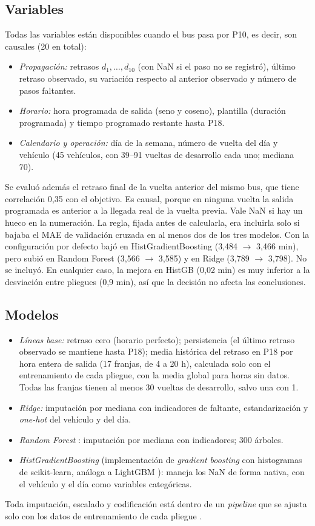\documentclass[conference,spanish]{IEEEtran}
\begin{document}
\subsection{Variables}
Todas las variables están disponibles cuando el bus pasa por P10, es decir, son causales (20 en total):
\begin{itemize}
    \item \emph{Propagación:} retrasos $d_1,\dots,d_{10}$ (con NaN si el paso no se registró), último retraso observado, su variación respecto al anterior observado y número de pasos faltantes.
    \item \emph{Horario:} hora programada de salida (seno y coseno), plantilla (duración programada) y tiempo programado restante hasta P18.
    \item \emph{Calendario y operación:} día de la semana, número de vuelta del día y vehículo (45 vehículos, con 39--91 vueltas de desarrollo cada uno; mediana 70).
\end{itemize}
Se evaluó además el retraso final de la vuelta anterior del mismo bus, que tiene correlación 0,35 con el objetivo. Es causal, porque en ninguna vuelta la salida programada es anterior a la llegada real de la vuelta previa. Vale NaN si hay un hueco en la numeración. La regla, fijada antes de calcularla, era incluirla solo si bajaba el MAE de validación cruzada en al menos dos de los tres modelos. Con la configuración por defecto bajó en HistGradientBoosting (3,484 $\to$ 3,466 min), pero subió en Random Forest (3,566 $\to$ 3,585) y en Ridge (3,789 $\to$ 3,798). No se incluyó. En cualquier caso, la mejora en HistGB (0,02 min) es muy inferior a la desviación entre pliegues (0,9 min), así que la decisión no afecta las conclusiones.

\subsection{Modelos}
\begin{itemize}
    \item \emph{Líneas base:} retraso cero (horario perfecto); persistencia (el último retraso observado se mantiene hasta P18); media histórica del retraso en P18 por hora entera de salida (17 franjas, de 4 a 20 h), calculada solo con el entrenamiento de cada pliegue, con la media global para horas sin datos. Todas las franjas tienen al menos 30 vueltas de desarrollo, salvo una con 1.
    \item \emph{Ridge:} imputación por mediana con indicadores de faltante, estandarización y \textit{one-hot} del vehículo y del día.
    \item \emph{Random Forest} \cite{breiman2001}: imputación por mediana con indicadores; 300 árboles.
    \item \emph{HistGradientBoosting} (implementación de \textit{gradient boosting} con histogramas de scikit-learn, análoga a LightGBM \cite{ke2017}): maneja los NaN de forma nativa, con el vehículo y el día como variables categóricas.
\end{itemize}
Toda imputación, escalado y codificación está dentro de un \textit{pipeline} que se ajusta solo con los datos de entrenamiento de cada pliegue \cite{pedregosa2011,kaufman2012}.
\end{document}
